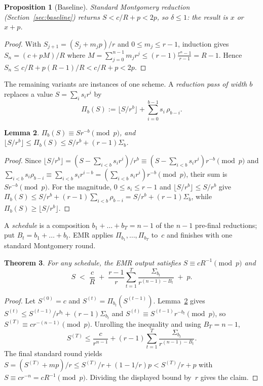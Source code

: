 \documentclass[reqno]{amsart}
\newtheorem{theorem}{Theorem}[section]
\newtheorem{proposition}[theorem]{Proposition}
\newtheorem{lemma}[theorem]{Lemma}
\theoremstyle{definition}
\begin{document}
\begin{proposition}[Baseline]\label{prop:base}
Standard Montgomery reduction (Section~\ref{sec:baseline}) returns $S<c/R+p<2p$, so $\delta\le1$: the result is $x$ or $x+p$.
\end{proposition}

\begin{proof}
With $S_{j+1}=(S_j+m_jp)/r$ and $0\le m_j\le r-1$, induction gives $S_n=(c+pM)/R$ where $M=\sum_{j=0}^{n-1}m_jr^j\le(r-1)\frac{r^n-1}{r-1}=R-1$.
Hence $S_n\le c/R+p(R-1)/R<c/R+p<2p$.
\end{proof}

The remaining variants are instances of one scheme.
A \emph{reduction pass of width $b$} replaces a value $S=\sum_i s_ir^i$ by
\[
  \Pi_b(S) := \Big\lfloor S/r^b\Big\rfloor + \sum_{i=0}^{b-1} s_i\,\rho_{b-i}.
\]

\begin{lemma}\label{lem:pass}
$\Pi_b(S)\equiv Sr^{-b}\pmod p$, and $\big\lfloor S/r^b\big\rfloor\le \Pi_b(S)\le S/r^b+(r-1)\Sigma_b$.
\end{lemma}

\begin{proof}
Since $\lfloor S/r^b\rfloor=(S-\sum_{i<b}s_ir^i)/r^b\equiv(S-\sum_{i<b}s_ir^i)r^{-b}\pmod p$ and $\sum_{i<b}s_i\rho_{b-i}\equiv\sum_{i<b}s_ir^{i-b}=(\sum_{i<b}s_ir^i)r^{-b}\pmod p$, their sum is $Sr^{-b}\pmod p$.
For the magnitude, $0\le s_i\le r-1$ and $\lfloor S/r^b\rfloor\le S/r^b$ give $\Pi_b(S)\le S/r^b+(r-1)\sum_{i<b}\rho_{b-i}=S/r^b+(r-1)\Sigma_b$, while $\Pi_b(S)\ge\lfloor S/r^b\rfloor$.
\end{proof}

A \emph{schedule} is a composition $b_1+\dots+b_T=n-1$ of the $n-1$ pre-final reductions; put $B_t=b_1+\dots+b_t$.
EMR applies $\Pi_{b_1},\dots,\Pi_{b_T}$ to~$c$ and finishes with one standard Montgomery round.

\begin{theorem}\label{thm:overflow}
For any schedule, the EMR output satisfies $S\equiv cR^{-1}\pmod p$ and
\[
  S \;<\; \frac{c}{R} \;+\; \frac{r-1}{r}\sum_{t=1}^{T}\frac{\Sigma_{b_t}}{r^{(n-1)-B_t}} \;+\; p.
\]
\end{theorem}

\begin{proof}
Let $S^{(0)}=c$ and $S^{(t)}=\Pi_{b_t}(S^{(t-1)})$.
Lemma~\ref{lem:pass} gives $S^{(t)}\le S^{(t-1)}/r^{b_t}+(r-1)\Sigma_{b_t}$ and $S^{(t)}\equiv S^{(t-1)}r^{-b_t}\pmod p$, so $S^{(T)}\equiv cr^{-(n-1)}\pmod p$.
Unrolling the inequality and using $B_T=n-1$,
\[
  S^{(T)} \le \frac{c}{r^{n-1}} + (r-1)\sum_{t=1}^{T}\frac{\Sigma_{b_t}}{r^{(n-1)-B_t}}.
\]
The final standard round yields $S=(S^{(T)}+mp)/r\le S^{(T)}/r+(1-1/r)p<S^{(T)}/r+p$ with $S\equiv cr^{-n}=cR^{-1}\pmod p$.
Dividing the displayed bound by~$r$ gives the claim.
\end{proof}
\end{document}
